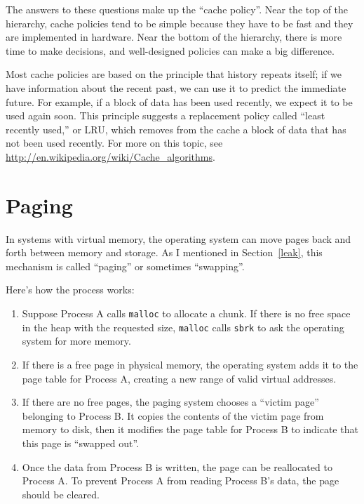 \documentclass[12pt]{book}
\begin{document}
{\begin{itemize}
\end{itemize}

The answers to these questions make up the ``cache policy''.
Near the top of the hierarchy, cache policies tend to be simple
because they have to be fast and they are implemented in hardware.
Near the bottom of the hierarchy, there is more time to make decisions,
and well-designed policies can make a big difference.

Most cache policies are based on the principle that history repeats
itself; if we have information about the recent past, we can use it to
predict the immediate future.  For example, if a block of data has
been used recently, we expect it to be used again soon.  This
principle suggests a replacement policy called ``least recently
used,'' or LRU, which removes from the cache a block of data that
has not been used recently.  For more on this topic, see
\url{http://en.wikipedia.org/wiki/Cache_algorithms}.


\section{Paging}
\label{paging}

In systems with virtual memory, the operating system can move
pages back and forth between memory and storage.  As I mentioned
in Section~\ref{leak}, this mechanism is called ``paging'' or
sometimes ``swapping''.

Here's how the process works:

\begin{enumerate}

\item Suppose Process A calls {\tt malloc} to allocate a chunk.  If there
is no free space in the heap with the requested size, {\tt malloc} calls
{\tt sbrk} to ask the operating system for more memory.

\item If there is a free page in physical memory, the operating system
adds it to the page table for Process A, creating a new range of valid
virtual addresses.

\item If there are no free pages, the paging system chooses a ``victim
page'' belonging to Process B.  It copies the contents of the victim
page from memory to disk, then it modifies the page table for Process
B to indicate that this page is ``swapped out''.

\item Once the data from Process B is written, the page can be reallocated
to Process A.  To prevent Process A from reading Process B's data, the
page should be cleared.


\end{enumerate}}
\end{document}
